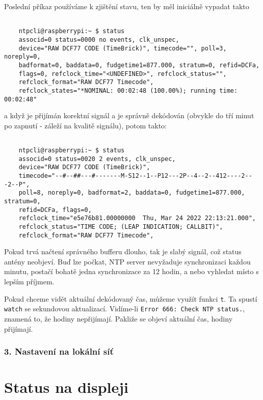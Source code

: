     \noindent Poslední příkaz používáme k zjištění stavu, ten by měl iniciálně vypadat takto

    {\scriptsize

    \begin{lstlisting}

    ntpcli@raspberrypi:~ $ status
    associd=0 status=0000 no events, clk_unspec,
    device="RAW DCF77 CODE (TimeBrick)", timecode="", poll=3, noreply=0,
    badformat=0, baddata=0, fudgetime1=877.000, stratum=0, refid=DCFa,
    flags=0, refclock_time="<UNDEFINED>", refclock_status="",
    refclock_format="RAW DCF77 Timecode",
    refclock_states="*NOMINAL: 00:02:48 (100.00%); running time: 00:02:48"

    \end{lstlisting}
    }

    a když je přijímán korektní signál a je správně dekódován (obvykle do tří minut po
    zapnutí - záleží na kvalitě signálu), potom takto:

    {\scriptsize

    \begin{lstlisting}

    ntpcli@raspberrypi:~ $ status
    associd=0 status=0020 2 events, clk_unspec,
    device="RAW DCF77 CODE (TimeBrick)",
    timecode="--#--##---#-------M-S12--1--P12---2P--4--2--412----2---2--P",
    poll=8, noreply=0, badformat=2, baddata=0, fudgetime1=877.000, stratum=0,
    refid=DCFa, flags=0,
    refclock_time="e5e76b81.00000000  Thu, Mar 24 2022 22:13:21.000",
    refclock_status="TIME CODE; (LEAP INDICATION; CALLBIT)",
    refclock_format="RAW DCF77 Timecode",

    \end{lstlisting}
    }

    Pokud trvá načtení správného bufferu dlouho, tak je slabý signál, což status antény
    neobjeví. Buď lze počkat, NTP server nevyžaduje synchronizaci každou minutu, postačí
    bohatě jedna synchronizace za 12 hodin, a nebo vyhledat místo s lepším příjmem.

    Pokud chceme vidět aktuální dekódovaný čas, můžeme využít funkci \verb|t|. Ta spustí
    \verb|watch| se sekundovou aktualizací. Vidíme-li \verb|Error 666: Check NTP status.|, znamená to, že hodiny nepřijímají. Pakliže se objeví aktuální čas, hodiny
    přijímají.

\subsubsection{3. Nastavení na lokální síť}


\section{Status na displeji}
